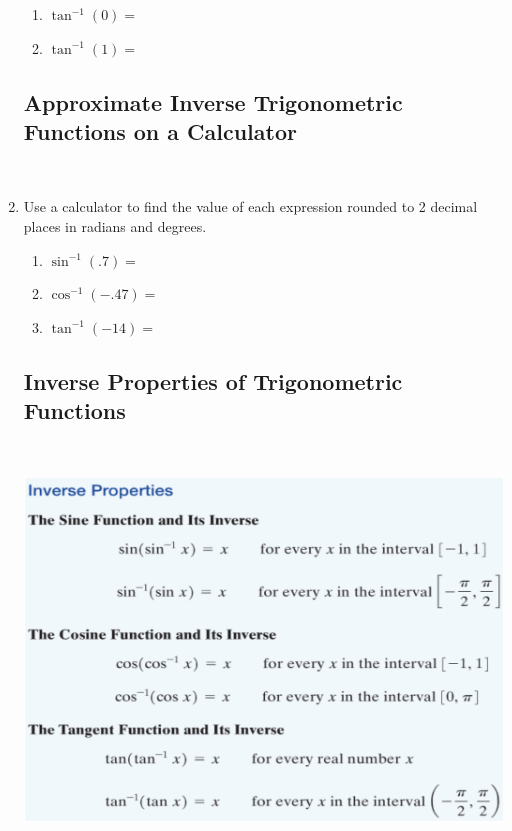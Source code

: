 \begin{enumerate}
\begin{enumerate}
\item $\displaystyle \tan^{-1}(0)=$\\[.5in]

\item $\displaystyle \tan^{-1}(1)=$\\[.5in]

\end{enumerate}


\subsection{Approximate Inverse Trigonometric Functions on a Calculator} ~

\item Use a calculator to find the value of each expression rounded to 2 decimal places in radians and degrees.
\begin{enumerate}
\item $\sin^{-1}(.7)=$\\
\item $\cos^{-1}(-.47)=$\\
\item $\tan^{-1}(-14)=$\\
\end{enumerate}


\newpage

\subsection{Inverse Properties of Trigonometric Functions} ~

\includegraphics[scale=.7]{inverseprops}


\end{enumerate}
